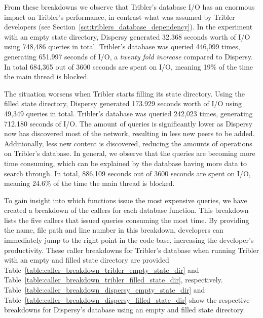 From these breakdowns we observe that Tribler's database I/O has an enormous impact on Tribler's performance, in contrast what was assumed by Tribler developers (see Section~\ref{sct:triblers_database_dependency}).
In the experiment with an empty state directory, Dispersy generated 32.368 seconds worth of I/O using 748,486 queries in total.
Tribler's database was queried 446,099 times, generating 651.997 seconds of I/O, a \emph{twenty fold increase} compared to Dispersy.
In total 684,365 out of 3600 seconds are spent on I/O, meaning 19\% of the time the main thread is blocked.

The situation worsens when Tribler starts filling its state directory.
Using the filled state directory, Dispersy generated 173.929 seconds worth of I/O using 49,349 queries in total.
Tribler's database was queried 242,023 times, generating 712.180 seconds of I/O.
The amount of queries is significantly lower as Dispersy now has discovered most of the network, resulting in less new peers to be added.
Additionally, less new content is discovered, reducing the amounts of operations on Tribler's database.
In general, we observe that the queries are becoming more time consuming, which can be explained by the database having more data to search through.
In total, 886,109 seconds out of 3600 seconds are spent on I/O, meaning 24.6\% of the time the main thread is blocked.

To gain insight into which functions issue the most expensive queries, we have created a breakdown of the callers for each database function.
This breakdown lists the five callers that issued queries consuming the most time.
By providing the name, file path and line number in this breakdown, developers can immediately jump to the right point in the code base, increasing the developer's productivity.
These caller breakdowns for Tribler's database when running Tribler with an empty and filled state directory are provided Table~\ref{table:caller_breakdown_tribler_empty_state_dir} and Table~\ref{table:caller_breakdown_tribler_filled_state_dir}, respectively.
Table~\ref{table:caller_breakdown_dispersy_empty_state_dir} and Table~\ref{table:caller_breakdown_dispersy_filled_state_dir} show the respective breakdowns for Dispersy's database using an empty and filled state directory.
	
